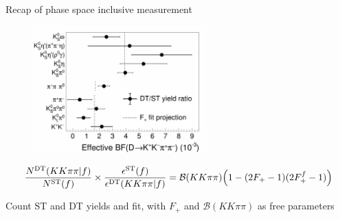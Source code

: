 \documentclass{beamer}
\begin{document}
\begin{frame}{Recap of phase space inclusive measurement}
  \begin{figure}
    \centering
    \includegraphics[width = 0.6\textwidth]{Plots/CPeven_fraction_combination_CPtags.png}
  \end{figure}
  \begin{equation*}
    \frac{N^{\rm DT}(KK\pi\pi | f)}{N^{\rm ST}(f)}\times\frac{\epsilon^{\rm ST}(f)}{\epsilon^{\rm DT}(KK\pi\pi | f)} = \mathcal{B}(KK\pi\pi)\Big(1 - (2F_+ - 1)(2F_+^f - 1)\Big)
  \end{equation*}
  \begin{center}
    Count ST and DT yields and fit, with $F_+$ and $\mathcal{B}(KK\pi\pi)$ as free parameters
  \end{center}
\end{frame}
\end{document}
